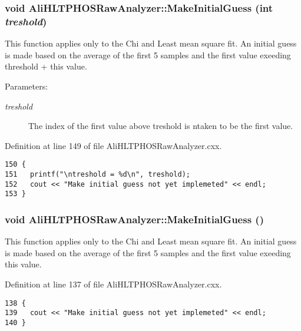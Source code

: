 \subsubsection{\setlength{\rightskip}{0pt plus 5cm}void Ali\-HLTPHOSRaw\-Analyzer::Make\-Initial\-Guess (int {\em treshold})\hspace{0.3cm}{\tt  [inherited]}}\label{classAliHLTPHOSRawAnalyzer_AliHLTPHOSRawAnalyzerPeakFindera16}


This function applies only to the Chi and Least mean square fit. An initial guess is made based on the average of the first 5 samples and the first value exeeding threshold + this value. \begin{Desc}
\item[Parameters:]
\begin{description}
\item[{\em treshold}]The index of the first value above treshold is ntaken to be the first value. \end{description}
\end{Desc}


Definition at line 149 of file Ali\-HLTPHOSRaw\-Analyzer.cxx.

\footnotesize\begin{verbatim}150 {
151   printf("\ntreshold = %d\n", treshold);
152   cout << "Make initial guess not yet implemeted" << endl;  
153 }
\end{verbatim}\normalsize 


\subsubsection{\setlength{\rightskip}{0pt plus 5cm}void Ali\-HLTPHOSRaw\-Analyzer::Make\-Initial\-Guess ()\hspace{0.3cm}{\tt  [inherited]}}\label{classAliHLTPHOSRawAnalyzer_AliHLTPHOSRawAnalyzerPeakFindera15}


This function applies only to the Chi and Least mean square fit. An initial guess is made based on the average of the first 5 samples and the first value exeeding this value. 

Definition at line 137 of file Ali\-HLTPHOSRaw\-Analyzer.cxx.

\footnotesize\begin{verbatim}138 {
139   cout << "Make initial guess not yet implemeted" << endl;
140 }
\end{verbatim}\normalsize 


